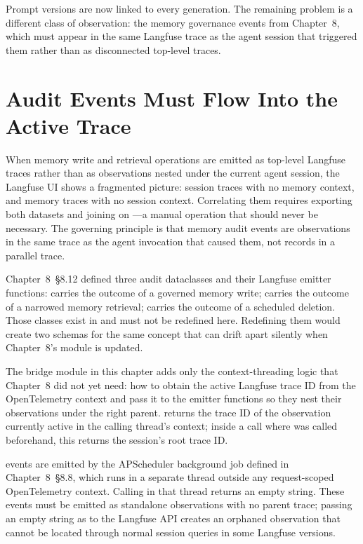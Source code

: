 Prompt versions are now linked to every generation. The remaining problem
is a different class of observation: the memory governance events from
Chapter~8, which must appear in the same Langfuse trace as the agent
session that triggered them rather than as disconnected top-level traces.


\section{Audit Events Must Flow Into the Active Trace}
\label{sec:obs-memory-audit}

When memory write and retrieval operations are emitted as top-level
Langfuse traces rather than as observations nested under the current
agent session, the Langfuse UI shows a fragmented picture: session
traces with no memory context, and memory traces with no session
context. Correlating them requires exporting both datasets and joining
on ---a manual operation that should never be
necessary. The governing principle is that memory audit events are
observations in the same trace as the agent invocation that caused them,
not records in a parallel trace.

Chapter~8~\S8.12 defined three audit dataclasses and their Langfuse
emitter functions:  carries the outcome of a
governed memory write;  carries the outcome
of a narrowed memory retrieval;  carries the
outcome of a scheduled deletion. Those classes exist in
 and must not be redefined here.
Redefining them would create two schemas for the same concept that can
drift apart silently when Chapter~8's module is updated.

The bridge module in this chapter adds only the context-threading logic
that Chapter~8 did not yet need: how to obtain the active Langfuse
trace ID from the OpenTelemetry context and pass it to the emitter
functions so they nest their observations under the right parent.
 returns the trace ID of the
observation currently active in the calling thread's context; inside a
 call where  was
called beforehand, this returns the session's root trace ID.

\begin{notebox}
 events are emitted by the APScheduler background
job defined in Chapter~8~\S8.8, which runs in a separate thread outside
any request-scoped OpenTelemetry context. Calling
 in that thread returns an empty string.
These events must be emitted as standalone observations with no parent
trace; passing an empty string as  to the Langfuse API
creates an orphaned observation that cannot be located through normal
session queries in some Langfuse versions.
\end{notebox}

